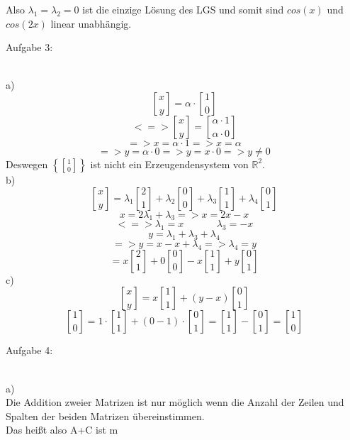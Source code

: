 \documentclass[11pt]{article}
\DeclareRobustCommand{\brkbinom}{\genfrac[]{0pt}{}}
\begin{document}
					Also $\lambda_1=\lambda_2=0$ ist die einzige Lösung des LGS und somit sind $cos(x)$ und $cos(2x)$ linear unabhängig.\\
			\noindent \begin{Large}Aufgabe 3:\end{Large}\\[2pt]
				\indent a)\\
					$$\brkbinom{x}{y}=\alpha \cdot \brkbinom{1}{0}$$
					$$<=>\brkbinom{x}{y}=\brkbinom{\alpha \cdot 1}{\alpha \cdot 0}$$
					$$=>x=\alpha \cdot 1 => x=\alpha$$
					$$=>y=\alpha \cdot 0 => y= x \cdot 0 => y \neq 0$$
					Deswegen $\left\{ \brkbinom{1}{0} \right\}$ ist nicht ein Erzeugendensystem von $\mathbb{R}^2$.\\
				\indent b)\\
					$$\brkbinom{x}{y}=\lambda_1 \brkbinom{2}{1}+\lambda_2 \brkbinom{0}{0}+\lambda_3 \brkbinom{1}{1}+\lambda_4 \brkbinom{0}{1}$$
					$$x=2\lambda_1+\lambda_3 => x=2x-x$$
					$$<=>\lambda_1=x \hspace{40pt} \lambda_3=-x$$
					$$y=\lambda_1+\lambda_3+\lambda_4$$
					$$=>y=x-x+\lambda_4 => \lambda_4=y$$
					$$=x \brkbinom{2}{1}+0 \brkbinom{0}{0}-x \brkbinom{1}{1}+y \brkbinom{0}{1}$$
				\indent c)\\
					$$\brkbinom{x}{y}=x\brkbinom{1}{1}+(y-x)\brkbinom{0}{1}$$
					$$\brkbinom{1}{0}=1 \cdot \brkbinom{1}{1}+(0-1) \cdot \brkbinom{0}{1}=\brkbinom{1}{1}-\brkbinom{0}{1}=\brkbinom{1}{0}$$
			\noindent \begin{Large}Aufgabe 4:\end{Large}\\[2pt]
				\indent a)\\
					Die Addition zweier Matrizen ist nur möglich wenn die Anzahl der Zeilen und Spalten der beiden Matrizen übereinstimmen.\\
					Das heißt also A+C ist m
\end{document}
